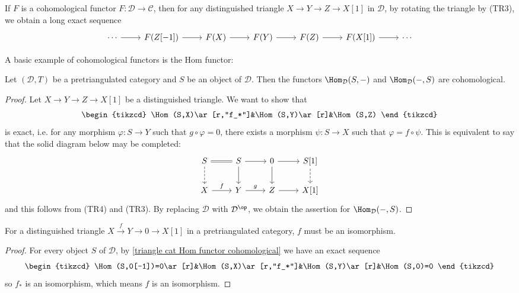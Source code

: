 If $F$ is a cohomological functor $F:\mathcal{D}\to\mathcal{C}$, then for any distinguished triangle $X\to Y\to Z\to X[1]$ in $\mathcal{D}$, by rotating the triangle by (TR3), we obtain a long exact sequence
\[\begin{tikzcd}
\cdots\ar[r]&F(Z[-1])\ar[r]&F(X)\ar[r]&F(Y)\ar[r]&F(Z)\ar[r]&F(X[1])\ar[r]&\cdots
\end{tikzcd}\]

A basic example of cohomological functors is the Hom functor:
\begin{proposition}\label{triangle cat Hom functor cohomological}
Let $(\mathcal{D},T)$ be a pretriangulated category and $S$ be an object of $\mathcal{D}$. Then the functors $\Hom_\mathcal{D}(S,-)$ and $\Hom_\mathcal{D}(-,S)$ are cohomological.
\end{proposition}
\begin{proof}
Let $X\to Y\to Z\to X[1]$ be a distinguished triangle. We want to show that
\[\begin{tikzcd}
\Hom(S,X)\ar[r,"f_*"]&\Hom(S,Y)\ar[r]&\Hom(S,Z)
\end{tikzcd}\]
is exact, i.e. for any morphism $\varphi:S\to Y$ such that $g\circ\varphi=0$, there exists a morphism $\psi:S\to X$ such that $\varphi=f\circ\psi$. This is equivalent to say that the solid diagram below may be completed:
\[\begin{tikzcd}
S\ar[d,dashed]\ar[r,equal]&S\ar[r]\ar[d]&0\ar[r]\ar[d]&S[1]\ar[d,dashed]\\
X\ar[r,"f"]&Y\ar[r,"g"]&Z\ar[r]&X[1]
\end{tikzcd}\]
and this follows from (TR4) and (TR3). By replacing $\mathcal{D}$ with $\mathcal{D}^{\op}$, we obtain the assertion for $\Hom_\mathcal{D}(-,S)$.
\end{proof}
\begin{corollary}\label{triangle cat zero dt isomorphism}
For a distinguished triangle $X\stackrel{f}{\to} Y\to 0\to X[1]$ in a pretriangulated category, $f$ must be an isomorphism.
\end{corollary}
\begin{proof}
For every object $S$ of $\mathcal{D}$, by \cref{triangle cat Hom functor cohomological} we have an exact sequence
\[\begin{tikzcd}
\Hom(S,0[-1])=0\ar[r]&\Hom(S,X)\ar[r,"f_*"]&\Hom(S,Y)\ar[r]&\Hom(S,0)=0
\end{tikzcd}\]
so $f_*$ is an isomorphism, which means $f$ is an isomorphism.
\end{proof}

